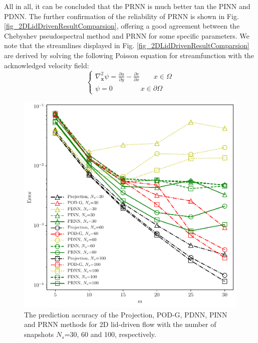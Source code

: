 \documentclass[preprint, 10pt]{elsarticle}
\begin{document}
All in all, it can be concluded that the PRNN is much better tan the PINN and PDNN. The further confirmation of the reliability of PRNN is shown in Fig. \ref{fig_2DLidDrivenResultComparsion}, offering a good agreement between the Chebyshev pseudospectral method and PRNN for some specific parameters. We note that the streamlines displayed in Fig. \ref{fig_2DLidDrivenResultComparsion} are derived by solving the following Poisson equation for streamfunction  with the acknowledged velocity field:
\begin{equation}
\left \{
\begin{aligned}
{\nabla_{\mathbf{x}} ^2}{\psi}
 = \frac{\partial u}{\partial y} - \frac{\partial v}{\partial x} \qquad x \in \Omega\\
\psi = 0  \qquad \qquad    x \in \partial \Omega
\end{aligned}
 \right .
\label{eq_Streamfunction}
\end{equation}


\begin{figure}[!ht]
  \centering
  \includegraphics[width=12cm]{../../pythonNN/2DLidDriven/fig/ErrorComparsion_SampleNum.pdf}
\caption{The prediction accuracy of the Projection, POD-G, PDNN, PINN and PRNN methods for 2D lid-driven flow with the number of snapshots $N_s$=30, 60 and 100, respectively.}
\label{fig_2DLidDrivenErrorComparsion_SampleNum}
\end{figure}
\end{document}
